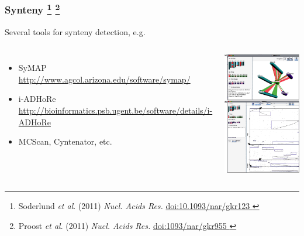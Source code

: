 %
\begin{frame}
  \frametitle{Synteny
    \footnote{\tiny{Soderlund \textit{et al}. (2011) \textit{Nucl. Acids Res.} \href{http://dx.doi.org/10.1093/nar/gkr123}{doi:10.1093/nar/gkr123
  }}}
    \footnote{\tiny{Proost \textit{et al}. (2011) \textit{Nucl. Acids Res.} \href{http://dx.doi.org/10..1093/nar/gkr955}{doi:1093/nar/gkr955
  }}}
}
  Several tools for synteny detection, e.g.
  \begin{columns}[T] 
      \begin{itemize}
        \item \textcolor{hutton_green}{SyMAP {\tiny\href{http://www.agcol.arizona.edu/software/symap/}{http://www.agcol.arizona.edu/software/symap/}}}
        \item \textcolor{hutton_blue}{i-ADHoRe {\tiny\href{http://bioinformatics.psb.ugent.be/software/details/i-ADHoRe}{http://bioinformatics.psb.ugent.be/software/details/i-ADHoRe}}}
        \item MCScan, Cyntenator, etc.  
      \end{itemize}  
        \includegraphics[height=0.6\textheight]{images/symap}
    \end{columns}
\end{frame}

